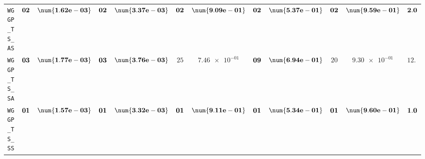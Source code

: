 \begin{xltabular}{\textwidth}{l||cC|cC|cC|cC|cC||c}
	\texttt{WGGP\_TS\_AS} & $\bf 02$ & $\bf \num{1.62e-03}$ & $\bf 02$ & $\bf \num{3.37e-03}$ & $\bf 02$ & $\bf \num{9.09e-01}$ & $\bf 02$ & $\bf \num{5.37e-01}$ & $\bf 02$ & $\bf \num{9.59e-01}$ & $\bf 2.0$  \\
	\texttt{WGGP\_TS\_SA} & $\bf 03$ & $\bf \num{1.77e-03}$ & $\bf 03$ & $\bf \num{3.76e-03}$ & $ 25$ & $ \num{7.46e-01}$ & $\bf 09$ & $\bf \num{6.94e-01}$ & $ 20$ & $ \num{9.30e-01}$ & $ 12.0$  \\
	\texttt{WGGP\_TS\_SS} & $\bf 01$ & $\bf \num{1.57e-03}$ & $\bf 01$ & $\bf \num{3.32e-03}$ & $\bf 01$ & $\bf \num{9.11e-01}$ & $\bf 01$ & $\bf \num{5.34e-01}$ & $\bf 01$ & $\bf \num{9.60e-01}$ & $\bf 1.0$  \\
\end{xltabular}
